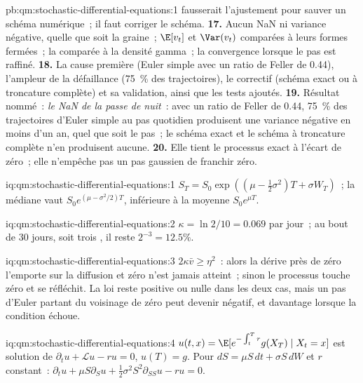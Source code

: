 \begin{solution}{pb:qm:stochastic-differential-equations:1}
fausserait l'ajustement pour sauver un schéma numérique~; il faut corriger le schéma.
\textbf{17.} Aucun NaN ni variance négative, quelle que soit la graine~; $\E[v_t]$ et $\Var(v_t)$ comparées à leurs
formes fermées~; la  comparée à la densité gamma~; la convergence lorsque le pas est raffiné.
\textbf{18.} La cause première (Euler simple avec un ratio de Feller de 0.44), l'ampleur de la défaillance (75~\% des
trajectoires), le correctif (schéma exact ou à troncature complète) et sa validation, ainsi que les tests ajoutés.
\textbf{19.} Résultat nommé~: \emph{le NaN de la passe de nuit}~: avec un ratio de Feller de 0.44, 75~\% des
trajectoires d'Euler simple au pas quotidien produisent une variance négative en moins d'un an, quel que soit le pas~; le
schéma exact et le schéma à troncature complète n'en produisent aucune.
\textbf{20.} Elle tient le processus exact à l'écart de zéro~; elle n'empêche pas un pas gaussien de
franchir zéro.
\end{solution}

\begin{solution}{iq:qm:stochastic-differential-equations:1}
$S_T = S_0\exp((\mu - \tfrac12\sigma^2)T + \sigma W_T)$~; la médiane vaut $S_0e^{(\mu - \sigma^2/2)T}$, inférieure à la moyenne
$S_0e^{\mu T}$.
\end{solution}

\begin{solution}{iq:qm:stochastic-differential-equations:2}
$\kappa = \ln 2/10 = 0.069$ par jour~; au bout de 30 jours, soit trois , il reste $2^{-3} = 12.5\%$.
\end{solution}

\begin{solution}{iq:qm:stochastic-differential-equations:3}
$2\kappa\bar v \ge \eta^2$~: alors la dérive près de zéro l'emporte sur la diffusion et zéro n'est jamais atteint~;
sinon le processus touche zéro et se réfléchit. La loi reste positive ou nulle dans les deux cas, mais un
pas d'Euler partant du voisinage de zéro peut devenir négatif, et davantage lorsque la condition échoue.
\end{solution}

\begin{solution}{iq:qm:stochastic-differential-equations:4}
$u(t,x) = \E[e^{-\int_t^Tr}g(X_T) \mid X_t = x]$ est solution de $\partial_tu + \mathcal Lu - ru = 0$, $u(T) = g$. Pour
$dS = \mu S\,dt + \sigma S\,dW$ et $r$ constant~: $\partial_tu + \mu S\partial_Su + \tfrac12\sigma^2S^2\partial_{SS}u - ru = 0$.
\end{solution}

